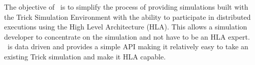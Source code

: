 %
%
%
%
%

The objective of \TrickHLA\ is to simplify the process of providing simulations
built with the Trick Simulation Environment\cite{Trick:Documentation} with
the ability to participate in distributed executions using the High Level
Architecture (HLA)\cite{IEEE1516:FRAMEWORK}.  This allows a simulation developer
to concentrate on the simulation and not have to be an HLA expert.
\TrickHLA\ is data driven and provides a simple API making it relatively easy
to take an existing Trick simulation and make it HLA capable.
